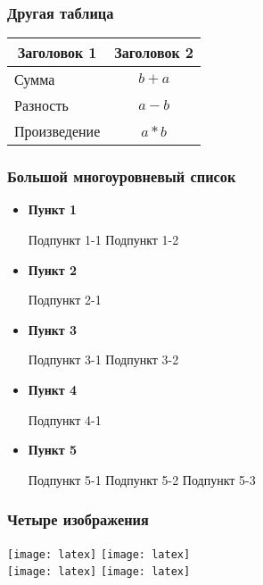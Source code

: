 \begin{frame}
    \frametitle{Другая таблица}
    \centering
    \begin{tabular}{lc}
        \toprule
        \multicolumn{1}{c}{\textbf{Заголовок 1}} & \textbf{Заголовок 2} \\ \midrule
        Сумма                                    & \(b+a\)              \\
        Разность                                 & \(a-b\)              \\
        Произведение                             & \(a*b\)              \\
        \bottomrule
    \end{tabular}
\end{frame}



\begin{frame}
    \frametitle{Большой многоуровневый список}
    \begin{itemize}
        \item \textbf{Пункт 1}
              \begin{itemize}
                  \itemi Подпункт 1-1
                  \itemi Подпункт 1-2
              \end{itemize}
        \item \textbf{Пункт 2}
              \begin{itemize}
                  \itemi Подпункт 2-1
              \end{itemize}
        \item \textbf{Пункт 3}
              \begin{itemize}
                  \itemi Подпункт 3-1
                  \itemi Подпункт 3-2
              \end{itemize}
        \item \textbf{Пункт 4}
              \begin{itemize}
                  \itemi Подпункт 4-1
              \end{itemize}
        \item \textbf{Пункт 5}
              \begin{itemize}
                  \itemi Подпункт 5-1
                  \itemi Подпункт 5-2
                  \itemi Подпункт 5-3
              \end{itemize}
    \end{itemize}
\end{frame}

\begin{frame}
    \frametitle{Четыре изображения}
    \centering
    \texttt{[image: latex]}
    \texttt{[image: latex]}\\
    \texttt{[image: latex]}
    \texttt{[image: latex]}
\end{frame}

